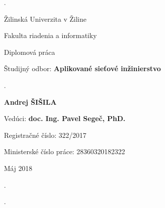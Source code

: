 \begin{titlepage}

\phantom.

\bigskip

\begin{center}
{\sc\LARGE Žilinská Univerzita v Žiline}
\medskip

{\sc\Large Fakulta riadenia a informatiky}

\vfill\vfill\vfill\vfill

{\sc\LARGE Diplomová práca}

\medskip

{\large Študijný odbor: {\bf Aplikované sieťové inžinierstvo}}
\end{center}


\vfill\vfill\vfill\vfill


\phantom.\hfill
\begin{center}
{\large\bf Andrej ŠIŠILA}

\medskip

{\large\bf \nazovpraceSK}

\medskip

Vedúci: {\bf doc. Ing. Pavel Segeč, PhD.}

\medskip
\bigskip

Registračné číslo: 322/2017

\medskip

Ministerské číslo práce: 28360320182322

\medskip

Máj 2018

\end{center}
\hspace{1.7cm}\phantom.

\vspace{2.9cm}

\phantom.
\end{titlepage}



